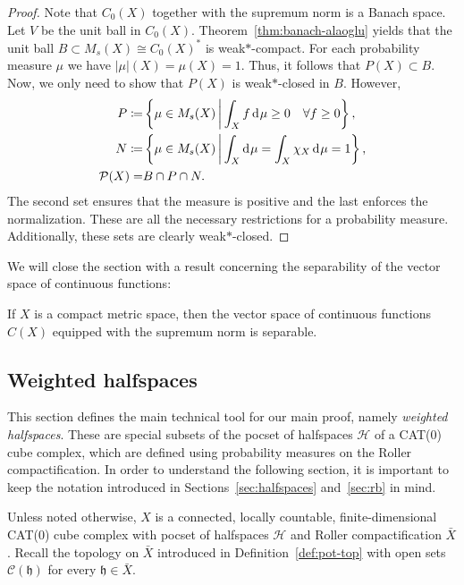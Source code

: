 \begin{proof}
  Note that \(C_0(X)\) together with the supremum norm is a Banach space. Let \(V\) be the unit ball in \(C_0(X)\). Theorem~\ref{thm:banach-alaoglu} yields that the unit ball \(B \subset M_s(X) \cong C_0(X)^\ast\) is weak\(\ast\)-compact. For each probability measure \(\mu\) we have \(|\mu|(X) = \mu(X) = 1\). Thus, it follows that \(P(X) \subset B\). Now, we only need to show that \(P(X)\) is weak\(\ast\)-closed in \(B\). However,
  \begin{align*}
    P \coloneqq & \left\{\mu \in M_s(X) \relmid \int_X f \d\mu \geq 0 \quad \forall f \geq 0\right\},\\
    N \coloneqq & \left\{\mu \in M_s(X) \relmid \int_X \d\mu = \int_X \chi_X \d\mu = 1\right\},\\
    \mathcal{P}(X)  = & B \cap P \cap N.
  \end{align*}
  The second set ensures that the measure is positive and the last enforces the normalization. These are all the necessary restrictions for a probability measure. Additionally, these sets are clearly weak\(\ast\)-closed.
\end{proof}

We will close the section with a result concerning the separability of the vector space of continuous functions:

\begin{lemma}
  \label{lem:continuous-separable}
  If \(X\) is a compact metric space, then the vector space of continuous functions \(C(X)\) equipped with the supremum norm is separable.
\end{lemma}

\subsection{Weighted halfspaces}
\label{sec:weight}

This section defines the main technical tool for our main proof, namely \emph{weighted halfspaces}. These are special subsets of the pocset of halfspaces \(\mathcal{H}\) of a CAT(0) cube complex, which are defined using probability measures on the Roller compactification. In order to understand the following section, it is important to keep the notation introduced in Sections~\ref{sec:halfspaces} and~\ref{sec:rb} in mind.

Unless noted otherwise, \(X\) is a connected, locally countable, finite-dimensional CAT(0) cube complex with pocset of halfspaces \(\mathcal{H}\) and Roller compactification \(\bar X\). Recall the topology on \(\bar X\) introduced in Definition~\ref{def:pot-top} with open sets \(\mathcal{C}(\mathfrak{h})\) for every \(\mathfrak{h} \in \bar X\).

